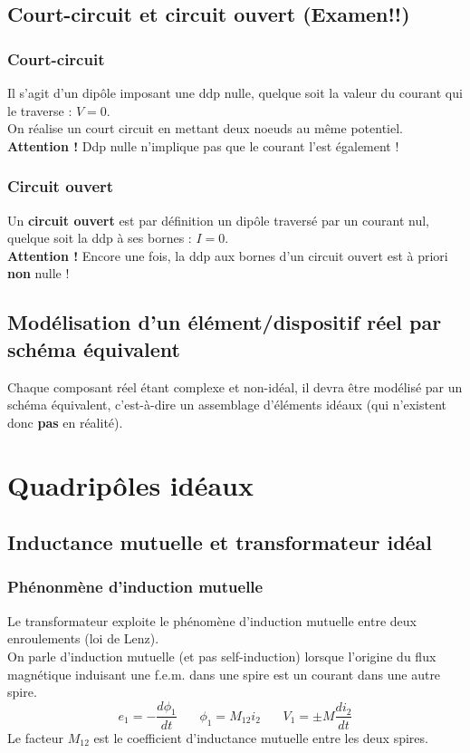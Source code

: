 \documentclass[11pt, a4paper, openany]{book}
\begin{document}
		
		
		
		
		
		
		\setcounter{section}{6}
		\section{Court-circuit et circuit ouvert (Examen!!)}
		\subsection{Court-circuit}
		Il s'agit d'un dipôle imposant une ddp nulle, quelque soit la valeur du courant qui le traverse : $V = 0$.\\ On réalise un court circuit en mettant deux noeuds au même potentiel.
		\textbf{Attention !} Ddp nulle n'implique pas que le courant l'est également !
		
		\subsection{Circuit ouvert}
		Un \textbf{circuit ouvert} est par définition un dipôle traversé par un courant nul, quelque soit la ddp à ses bornes : $I =0$.\\
		\textbf{Attention !} Encore une fois, la ddp aux bornes d'un circuit ouvert est à priori \textbf{non} nulle !
		
		\setcounter{section}{8}
		\section{Modélisation d'un élément/dispositif réel par schéma équivalent}
		Chaque composant réel étant complexe et non-idéal, il devra être modélisé par un schéma équivalent, c'est-à-dire un assemblage d'éléments idéaux (qui n'existent donc \textbf{pas} en réalité).
		
		
		\chapter{Quadripôles idéaux}
		\setcounter{section}{2}
		\section{Inductance mutuelle et transformateur idéal}
		\subsection{Phénonmène d'induction mutuelle}
		Le transformateur exploite le phénomène d'induction mutuelle entre deux enroulements (loi de Lenz).\\
		On parle d'induction mutuelle (et pas self-induction) lorsque l'origine du flux magnétique induisant une f.e.m. dans une spire est un courant dans une autre spire.
		\begin{equation}
		e_1 = -\frac{d\phi_1}{dt}\ \ \ \ \ \ \ \ \phi_1 = M_{12}i_2\ \ \ \ \ \ \ \ V_1 = \pm M\frac{di_2}{dt}
		\end{equation}
		Le facteur $M_{12}$ est le coefficient d'inductance mutuelle entre les deux spires.
		
\end{document}

